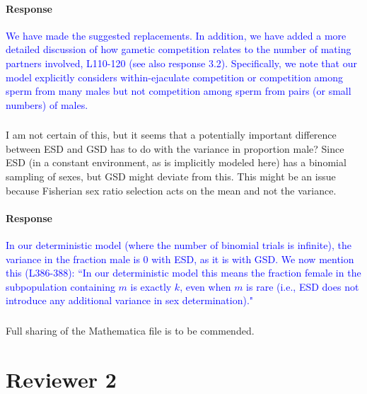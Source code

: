 \documentclass[10pt,letterpaper]{article}
\begin{document}
\noindent\paragraph{Response}
\textcolor{blue}{We have made the suggested replacements.
In addition, we have added a more detailed discussion of how gametic competition relates to the number of mating partners involved, L110-120 (see also response 3.2). 
Specifically, we note that our model explicitly considers within-ejaculate competition or competition among sperm from many males but not competition among sperm from pairs (or small numbers) of males. 
}

\noindent\subsubsection{}
I am not certain of this, but it seems that a potentially important difference between ESD and GSD has to do with the variance in proportion male? Since ESD (in a constant environment, as is implicitly modeled here) has a binomial sampling of sexes, but GSD might deviate from this.  This might be an issue because Fisherian sex ratio selection acts on the mean and not the variance.

\noindent\paragraph{Response}
\textcolor{blue}{In our deterministic model (where the number of binomial trials is infinite), the variance in the fraction male is 0 with ESD, as it is with GSD. 
We now mention this (L386-388): ``In our deterministic model this means the fraction female in the subpopulation containing $m$ is exactly $k$, even when $m$ is rare (i.e., ESD does not introduce any additional variance in sex determination)." 
 }

\noindent\subsubsection{}
Full sharing of the Mathematica file is to be commended.

\section{Reviewer 2}
\end{document}
